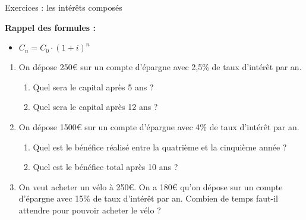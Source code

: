 



	\vspace{3em}
	\begin{center}
			{\Large Exercices : les intérêts composés}
	\end{center}
	
	\vspace{3em}
	
	\textbf{Rappel des formules :}
	\begin{itemize}
		\item $C_n = C_0 \cdot \left(1 + i\right)^n$
	\end{itemize}

	\vspace{3em}
	
	\begin{enumerate}
		\item 
			On dépose 250€ sur un compte d'épargne avec 2,5\% de taux d'intérêt par an.
			\begin{enumerate}
				\item Quel sera le capital après 5 ans ?
				\item Quel sera le capital après 12 ans ?
			\end{enumerate}
			\vspace{3em}
			
		\item 
			On dépose 1500€ sur un compte d'épargne avec 4\% de taux d'intérêt par an.
			\begin{enumerate}
				\item Quel est le bénéfice réalisé entre la quatrième et la cinquième année ?
				\item Quel est le bénéfice total après 10 ans ?
			\end{enumerate}
			\vspace{3em}
			
		\item 
			On veut acheter un vélo à 250€. On a 180€ qu'on dépose sur un compte d'épargne avec 15\% de taux d'intérêt par an. Combien de temps faut-il attendre pour pouvoir acheter le vélo ?
			
	\end{enumerate}
	
